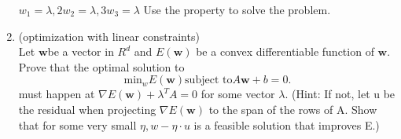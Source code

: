 \documentclass[12pt]{article}
\theoremstyle{definition}
\begin{document}
\begin{enumerate}
$w_1 = \lambda,2w_2 = \lambda, 3w_3 = \lambda $ Use the property to solve the problem.
  \item (optimization with linear constraints)\\
  Let $\mathbf{w}$be a vector in $R^d$ and $E(\mathbf{w})$ be a convex differentiable function of $\mathbf{w}$.
   Prove that the optimal solution to
   \[
   \text{min}_{w}E(\mathbf{w}) \text{subject to} A\mathbf{w}+b = 0
   .\] 
   must happen at $\nabla E(\mathbf{w})+\lambda^T A = 0 $ for some vector $\lambda$.
   (Hint: If not, let u be the residual when
    projecting $\nabla E(\mathbf{w})$ to the span of the rows of A.
    Show that for some very small  $\eta, w - \eta · u $ is a feasible
    solution that improves E.)
\end{enumerate}
\end{document}
